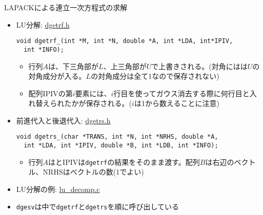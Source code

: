 \begin{frame}[t,fragile]{LAPACKによる連立一次方程式の求解}
  \begin{itemize}
  \item LU分解: \href{https://github.com/todo-group/computer-experiments/blob/master/exercise/include/dgetrf.h}{dgetrf.h}
\begin{lstlisting}
void dgetrf_(int *M, int *N, double *A, int *LDA, int*IPIV,
  int *INFO);
\end{lstlisting}
\begin{itemize}
\item 行列$A$は、下三角部が$L$、上三角部が$U$で上書きされる。(対角にはは$U$の対角成分が入る。$L$の対角成分は全て1なので保存されない)
\item 配列IPIVの第$i$要素には、$i$行目を使ってガウス消去する際に何行目と入れ替えられたかが保存される。($i$は1から数えることに注意)
\end{itemize}
  \item 前進代入と後退代入: \href{https://github.com/todo-group/computer-experiments/blob/master/exercise/include/dgetrs.h}{dgetrs.h}
\begin{lstlisting}
void dgetrs_(char *TRANS, int *N, int *NRHS, double *A,
  int *LDA, int *IPIV, double *B, int *LDB, int *INFO);
\end{lstlisting}
\begin{itemize}
\item 行列$A$はとIPIVは{\tt dgetrf}の結果をそのまま渡す。配列$B$は右辺のベクトル、NRHSはベクトルの数(1でよい)
\end{itemize}
  \item LU分解の例: \href{https://github.com/todo-group/computer-experiments/blob/master/exercise/linear_system/lu_decomp.c}{lu\_decomp.c}
  \item {\tt dgesv}は中で{\tt dgetrf}と{\tt dgetrs}を順に呼び出している
  \end{itemize}
\end{frame}
